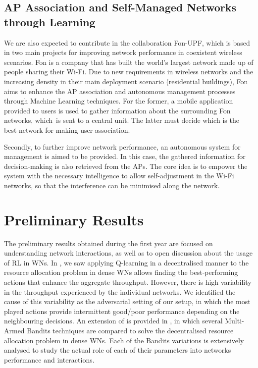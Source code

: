 \documentclass[12pt, a4paper,twoside]{tesi_upf}
\begin{document}
			\subsection{AP Association and Self-Managed Networks through Learning}
			\label{section:fon_project}	
				We are also expected to contribute in the collaboration Fon-UPF, which is based in two main projects for improving network performance in coexistent wireless scenarios. Fon is a company that has built the world's largest network made up of people sharing their Wi-Fi. Due to new requirements in wireless networks and the increasing density in their main deployment scenario (residential buildings), Fon aims to enhance the AP association and autonomous management processes through Machine Learning techniques. For the former, a mobile application provided to users is used to gather information about the surrounding Fon networks, which is sent to a central unit. The latter must decide which is the best network for making user association.
				
				Secondly, to further improve network performance, an autonomous system for management is aimed to be provided. In this case, the gathered information for decision-making is also retrieved from the APs. The core idea is to empower the system with the necessary intelligence to allow self-adjustment in the Wi-Fi networks, so that the interference can be minimised along the network.
			
		\section{Preliminary Results}
		\label{section:preliminary_results}	
			The preliminary results obtained during the first year are focused on understanding network interactions, as well as to open discussion about the usage of RL in WNs. In \cite{wilhelmi2017implications}, we saw applying Q-learning in a decentralised manner to the resource allocation problem in dense WNs allows finding the best-performing actions that enhance the aggregate throughput. However, there is high variability in the throughput experienced by the individual networks. We identified the cause of this variability as the adversarial setting of our setup, in which the most played actions provide intermittent good/poor performance depending on the neighbouring decisions. An extension of \cite{wilhelmi2017implications} is provided in \cite{wilhelmi2017enhancing}, in which several Multi-Armed Bandits techniques are compared to solve the decentralised resource allocation problem in dense WNs. Each of the Bandits variations is extensively analysed to study the actual role of each of their parameters into networks performance and interactions.
\end{document}
